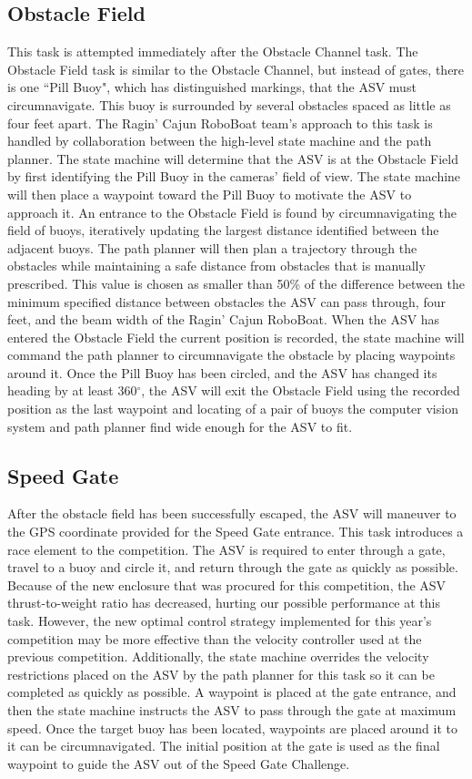 \documentclass[letterpaper, 12 pt, conference]{ieeeconf}
\begin{document}
\subsection{Obstacle Field}
\label{ObstacleField}
This task is attempted immediately after the Obstacle Channel task. The Obstacle Field task is similar to the Obstacle Channel, but instead of gates, there is one ``Pill Buoy", which has distinguished markings, that the ASV must circumnavigate. This buoy is surrounded by several obstacles spaced as little as four feet apart. The Ragin' Cajun RoboBoat team's approach to this task is handled by collaboration between the high-level state machine and the path planner. The state machine will determine that the ASV is at the Obstacle Field by first identifying the Pill Buoy in the cameras' field of view. The state machine will then place a waypoint toward the Pill Buoy to motivate the ASV to approach it. An entrance to the Obstacle Field is found by circumnavigating the field of buoys, iteratively updating the largest distance identified between the adjacent buoys. The path planner will then plan a trajectory through the obstacles while maintaining a safe distance from obstacles that is manually prescribed. This value is chosen as smaller than 50\% of the difference between the minimum specified distance between obstacles the ASV can pass through, four feet, and the beam width of the Ragin' Cajun RoboBoat. When the ASV has entered the Obstacle Field the current position is recorded, the state machine will command the path planner to circumnavigate the obstacle by placing waypoints around it. Once the Pill Buoy has been circled, and the ASV has changed its heading by at least 360$^\circ$, the ASV will exit the Obstacle Field using the recorded position as the last waypoint  and locating of a pair of buoys the computer vision system and path planner find wide enough for the ASV to fit.

\subsection{Speed Gate}
\label{SpeedGate}
After the obstacle field has been successfully escaped, the ASV will maneuver to the GPS coordinate provided for the Speed Gate entrance. This task introduces a race element to the competition. The ASV is required to enter through a gate, travel to a buoy and circle it, and return through the gate as quickly as possible. Because of the new enclosure that was procured for this competition, the ASV thrust-to-weight ratio has decreased, hurting our possible performance at this task. However, the new optimal control strategy implemented for this year's competition may be more effective than the velocity controller used at the previous competition. Additionally, the state machine overrides the velocity restrictions placed on the ASV by the path planner for this task so it can be completed as quickly as possible. A waypoint is placed at the gate entrance, and then the state machine instructs the ASV to pass through the gate at maximum speed. Once the target buoy has been located, waypoints are placed around it to it can be circumnavigated. The initial position at the gate is used as the final waypoint to guide the ASV out of the Speed Gate Challenge.
\end{document}
